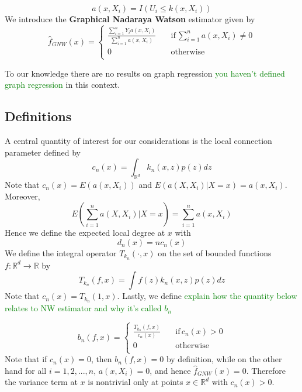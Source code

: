 \documentclass{article}
\newcommand\SB[1]{\textcolor{green}{#1}}
\begin{document}
\begin{equation*}
    a(x,X_i)=I(U_i\leq k(x,X_i))
\end{equation*}
We introduce the \textbf{Graphical Nadaraya Watson} estimator given by 
\begin{equation}
\label{gnw_def}
\hat{f}_{GNW}(x)=\begin{cases}
    \frac{\sum_{i=1}^n Y_ia(x,X_i)}{\sum_{i=1}^n a(x,X_i)} \quad &\text{if}\, \sum_{i=1}^n a(x,X_i)\neq 0\\
    0 \quad &\text{otherwise}\\
\end{cases}
\end{equation}


To our knowledge there are no results on graph regression \SB{you haven't
  defined graph regression} in this context.


\subsection{Definitions}
A central quantity of interest for our considerations is the local connection parameter defined by
\begin{equation}
\label{c_n_eqn}
    c_n(x)=\int_{\mathbb{R}^d} k_n(x,z)p(z)dz
\end{equation}
Note that $c_n(x)=E(a(x,X_i))$ and $E(a(X,X_i)|X=x)=a(x,X_i)$. Moreover,
\begin{equation*}
    E(\sum_{i=1}^na(X,X_i)|X=x)=\sum_{i=1}^n a(x,X_i)
\end{equation*}
Hence we define the expected local degree at $x$ with
\begin{equation}
\label{local_degree}
    d_n(x)=nc_n(x)
\end{equation}
We define the integral operator $T_{k_n}(\cdot,x)$ on the set of bounded functions  $f\colon\mathbb{R}^d\to\mathbb{R}$ by
\begin{equation*}
    T_{k_n}(f,x)=\int f(z)k_n(x,z)p(z)dz
\end{equation*}
Note that $c_n(x)=T_{k_n}(1,x)$. Lastly, we define \SB{explain how the quantity
  below relates to NW estimator and why it's called $b_n$}

\begin{equation*}
b_n(f,x)=\begin{cases}
    \frac{T_{k_n}(f,x)}{c_n(x)} \quad &\text{if}\, c_n(x)>0\\
    0 \quad &\text{otherwise}\\
\end{cases}
\end{equation*}
Note that if $c_n(x)=0$, then $b_n(f,x)=0$ by definition, while on the other hand for all $i=1,2,...,n$, $a(x,X_i)=0$, and hence $\hat{f}_{GNW}(x)=0$. Therefore the variance term at $x$ is nontrivial only at points $x\in\mathbb{R}^d$ with $c_n(x)>0$.
\end{document}
